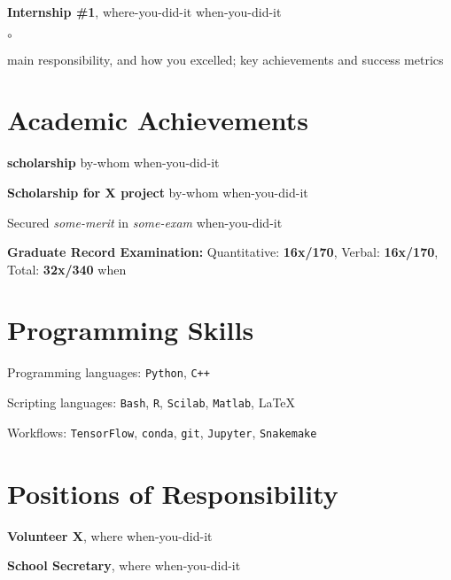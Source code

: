 \documentclass[margin,line]{res}
\newenvironment{list1}{
  \begin{list}{\ding{113}}{%
      \setlength{\itemsep}{0in}
      \setlength{\parsep}{0in} \setlength{\parskip}{0in}
      \setlength{\topsep}{0in} \setlength{\partopsep}{0in} 
      \setlength{\leftmargin}{0in}}}{\end{list}}
\newenvironment{list2}{
  \begin{list}{$\circ$}{%
      \setlength{\itemsep}{0in}
      \setlength{\parsep}{0in} \setlength{\parskip}{0in}
      \setlength{\topsep}{0in} \setlength{\partopsep}{0in} 
      \setlength{\leftmargin}{0.25in}}}{\end{list}}
\begin{document}
\begin{resume}
\vspace*{-.15in}
{\bf Internship \#1}, {\sf where-you-did-it} \hfill {when-you-did-it}

\begin{list2}
\item main responsibility, and how you excelled; key achievements and success metrics
\end{list2}

\vspace*{-0.1in}

\section{\sc Academic Achievements} 
\begin{list1}
\item []\textbf{scholarship} {\sf by-whom} \hfill {when-you-did-it}
\item []\textbf{Scholarship for X project } {\sf by-whom} \hfill {when-you-did-it}
\item [] Secured \textit{some-merit} in \textit{some-exam} \hfill {when-you-did-it}
\item [] {\bf Graduate Record Examination:}  Quantitative: {\bf 16x/170}, Verbal: {\bf 16x/170}, Total: {\bf 32x/340} \hfill {when}
\end{list1}

\vspace*{-0.1in}

\section{\sc Programming Skills} 
\begin{list1}
    \item [] Programming languages: \texttt{Python}, \texttt{C++}
    \item [] Scripting languages: \texttt{Bash}, \texttt{R}, \texttt{Scilab}, \texttt{Matlab}, \LaTeX
    \item [] Workflows: \texttt{TensorFlow}, \texttt{conda}, \texttt{git}, \texttt{Jupyter}, \texttt{Snakemake}
    \vspace*{.075in}
\end{list1}

\vspace*{-0.1in}

\section{\sc Positions of Responsibility} 
\begin{list1}
\item []{\bf Volunteer X}, \textsf{where} \hfill {when-you-did-it}
\item []{\bf School Secretary}, \textsf{where} \hfill {when-you-did-it}
\end{list1}


\end{resume}
\end{document}
